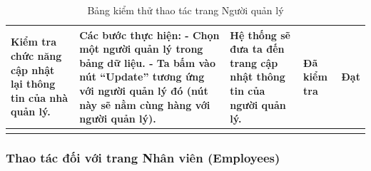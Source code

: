 \documentclass[a4paper]{article}
\begin{document}
\begin{longtable}{ | p{} |p{} | p{}  | p{}  | p{}  | }
\hline
Kiểm tra chức năng cập nhật lại thông tin của nhà quản lý. &
Các bước thực hiện: \newline
- Chọn một người quản lý trong bảng dữ liệu.     \newline
- Ta bấm vào nút “Update” tương ứng với người quản lý đó (nút này sẽ nằm cùng hàng với người quản lý). 
&
Hệ thống sẽ đưa ta đến trang cập nhật thông tin của người quản lý. &
Đã kiểm tra &
Đạt \\

\hline
\caption{Bảng kiểm thử thao tác trang Người quản lý}
\end{longtable}


\subsubsection{Thao tác đối với trang Nhân viên (Employees)}
\end{document}
